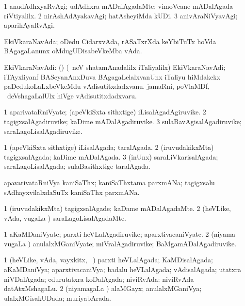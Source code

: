 \bentry
{}
\gl{\kirxvi}
\bmng
\bnum
\num{1} anudAdhxyaRvAgi; udAdhxra mADalAgadaMte; vimoVcane mADalAgada riVtiyalilx. 
\num{2} nirAshAdAyakavAgi; hatAsheyiMda kUDi. 
\num{3} anivAraNiVyavAgi; aparihAyaRvAgi. 
\enum
\emng
\eentry

\bentry
{}
\gl{\nA}
\bmng
EkiVkaraNavAda; oDedu CidarxvAda, rASaTxrXda keYbiTuTx hoVda BAgagaLanunx oMdugUDisabeVkeMba vAda. 
\emng
\eentry

\bentry
{}
\gl{\nA}
\bmng
EkiVkaraNavAdi: 
\banum
{} () (\kanmu\ neV shatamAnadalilx iTaliyalilx) EkiVkaraNavAdi; iTAyxliyanf BASeyanAnxDuva BAgagaLelalxvanUnx iTaliyu hiMdakekx paDedukoLaLxbeVkeMdu vAdisutitxdadxvanu. 
 jamaRni, poVlaMDf, \mo\ deVshagaLalUlx hiVge vAdisutitxdadxvaru. 
\eanum
\emng
\eentry

\bentry
{}
\gl{\nA}
\bmng
\bnum
\num{1} aparivataRniVyate; (apeVkiSxta sithxtige) iLisalAgadAgiruvike. 
\num{2} tagigxsalAgadiruvike; kaDime mADalAgadiruvike. 
\num{3} sulaBavAgisalAgadiruvike; saraLagoLisalAgadiruvike. 
\enum
\emng
\eentry

\bentry
{}
\gl{\gu}
\bmng
\bnum
\num{1} (apeVkiSxta sithxtige) iLisalAgada; taralAgada. 
\num{2} (iruvudakikxMta) tagigxsalAgada; kaDime mADalAgada. 
\num{3} (inUnx) saraLiVkarisalAgada; saraLagoLisalAgada; sulaBasithxtige taralAgada. 
\enum
\emng
\eentry

\bentry
{}
\gl{\nA}
\bmng
apavarivataRniVya kaniSaThx; kaniSaThxtama parxmANa; tagigxsalu sAdhayxvilalxdaSuTx kaniSaThx parxmANa. 
\emng
\eentry

\bentry
{}
\gl{\kirxvi}
\bmng
\bnum
\num{1} (iruvudakikxMta) tagigxsalAgade; kaDame mADalAgadaMte. 
\num{2} (heVLike, vAda, \mo vugaLa \vi) saraLagoLisalAgadaMte. 
\enum
\emng
\eentry

\bentry
{}
\gl{\nA}
\bmng
\bnum
\num{1} aKaMDaniVyate; parxti heVLalAgadiruvike; aparxtivacaniVyate. 
\num{2} (niyama \mo vugaLa \vi) anulalxMGaniVyate; miVralAgadiruvike; BaMgamADalAgadiruvike. 
\enum
\emng
\eentry

\bentry
{}
\gl{\gu}
\bmng
\bnum
\num{1} (heVLike, vAda, vayxkitx, \mo\ \vi) parxti heVLalAgada; KaMDisalAgada; aKaMDaniVya; aparxtivacaniVya; badalu heVLalAgada; vAdisalAgada; utatxra niVDalAgada; edurutatxra koDalAgada; niviRvAda:  niviRvAda datAtxMshagaLu. 
\num{2} (niyamagaLa \vi) alaMGayx; anulalxMGaniVya; ulalxMGisakUDada; muriyabArada. 
\enum
\emng
\eentry


